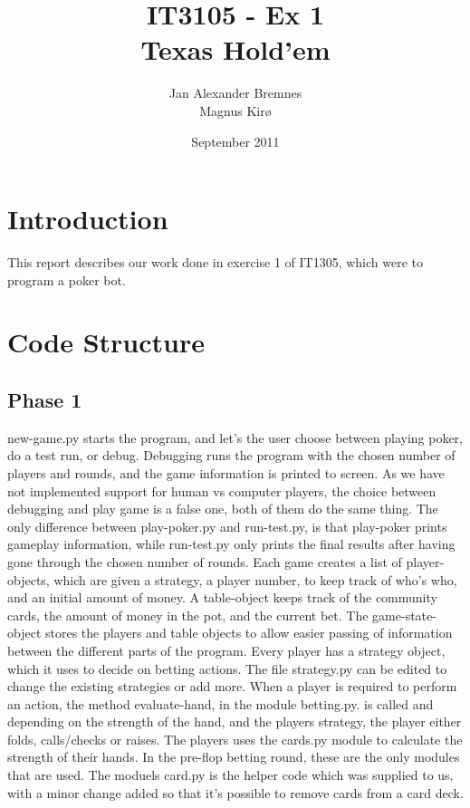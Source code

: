 \documentclass[titlepage]{article}
\author{Jan Alexander Bremnes\\Magnus Kirø}
\title{IT3105 - Ex 1\\Texas Hold'em}
\date{September 2011}
\begin{document}
\maketitle

\tableofcontents
{}
\newpage

\section{Introduction}
	This report describes our work done in exercise 1 of IT1305, which were to program a poker bot. 
	
\section{Code Structure}
	\subsection{Phase 1}
		new-game.py starts the program, and let's the user choose between playing poker, do a test run, or debug. Debugging runs the program with the chosen number of players and rounds, and the game information is printed to screen. As we have not implemented support for human vs computer players, the choice between debugging and play game is a false one, both of them do the same thing. The only difference between play-poker.py and run-test.py, is that play-poker prints gameplay information, while run-test.py only prints the final results after having gone through the chosen number of rounds. Each game creates a list of player-objects, which are given a strategy, a player number, to keep track of who's who, and an initial amount of money. A table-object keeps track of the community cards, the amount of money in the pot, and the current bet. The game-state-object stores the players and table objects to allow easier passing of information between the different parts of the program. Every player has a strategy object, which it uses to decide on betting actions. The file strategy.py can be edited to change the existing strategies or add more. When a player is required to perform an action, the method evaluate-hand, in the module betting.py. is called and depending on the strength of the hand, and the players strategy, the player either folds, calls/checks or raises. The players uses the cards.py module to calculate the strength of their hands. In the pre-flop betting round, these are the only modules that are used. The moduels card.py is the helper code which was supplied to us, with a minor change added so that it's possible to remove cards from a card deck.
		
\end{document}
